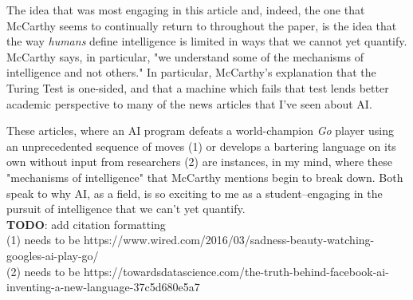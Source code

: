 \documentclass{article}
\begin{document}
  
  \graphicspath{{./hw1-images/}}
\par The idea that was most engaging in this article and, indeed, the one that McCarthy seems to continually return to throughout the paper, is the idea that the way \textit{humans} define intelligence is limited in ways that we cannot yet quantify. 
McCarthy says, in particular, "we understand some of the mechanisms of intelligence and not others." 
In particular, McCarthy's explanation that the Turing Test is one-sided, and that a machine which fails that test lends better academic perspective to many of the news articles that I've seen about AI. 
\par These articles, where an AI program defeats a world-champion \textit{Go} player using an unprecedented sequence of moves (1) 
or develops a bartering language on its own without input from researchers (2) are instances, in my mind, where these "mechanisms of intelligence" that McCarthy mentions begin to break down. 
Both speak to why AI, as a field, is so exciting to me as a student--engaging in the pursuit of intelligence that we can't yet quantify.
\\[0.5in]
\textbf{TODO}: add citation formatting
\\
(1) needs to be https://www.wired.com/2016/03/sadness-beauty-watching-googles-ai-play-go/
\\
(2) needs to be https://towardsdatascience.com/the-truth-behind-facebook-ai-inventing-a-new-language-37c5d680e5a7
\end{document}

